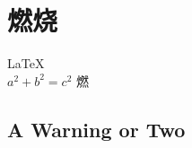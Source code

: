 \documentclass[UTF8]{article}
\begin{document}
       
 
\section{燃烧}          
\LaTeX \,\\ 
 $a^2+b^2=c^2$
 燃
\subsection{A Warning or Two}  

\end{document}
